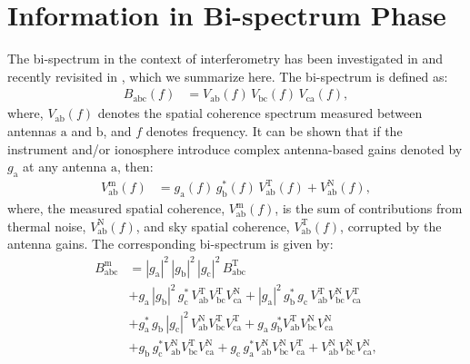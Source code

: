 \documentclass[
reprint,
superscriptaddress,
amsmath,
amssymb,
aps,
]{revtex4-1}
\begin{document}
\section{Information in Bi-spectrum Phase}\label{sec:CPinfo}

The bi-spectrum in the context of interferometry has been investigated in \cite{jen58,kul89,tay99,tho01} and recently revisited in \cite{car18}, which we summarize here. The bi-spectrum is defined as:
\begin{align}
  B_\textrm{abc}(f) &= V_\textrm{ab}(f)\,V_\textrm{bc}(f)\,V_\textrm{ca}(f),
\end{align}
where, $V_\textrm{ab}(f)$ denotes the spatial coherence spectrum measured between antennas $\textrm{a}$ and $\textrm{b}$, and $f$ denotes frequency. It can be shown that if the instrument and/or ionosphere introduce complex antenna-based gains denoted by $g_\textrm{a}$ at any antenna $\textrm{a}$, then: 
\begin{align}
  V_\textrm{ab}^\textrm{m}(f) &= g_\textrm{a}(f)\, g_\textrm{b}^*(f)\, V_\textrm{ab}^\textrm{T}(f) + V_\textrm{ab}^\textrm{N}(f),
\end{align}
where, the measured spatial coherence, $V_\textrm{ab}^\textrm{m}(f)$, is the sum of contributions from thermal noise, $V_\textrm{ab}^\textrm{N}(f)$, and sky spatial coherence, $V_\textrm{ab}^\textrm{T}(f)$, corrupted by the antenna gains. The corresponding bi-spectrum is given by:
\begin{align}\label{eqn:bispectrum-terms}
  B_\textrm{abc}^\textrm{m} &= |g_\textrm{a}|^2\, |g_\textrm{b}|^2\, |g_\textrm{c}|^2\, B_\textrm{abc}^\textrm{T} \\
  &+ g_\textrm{a}\,|g_\textrm{b}|^2\,g_\textrm{c}^*\,V_\textrm{ab}^\textrm{T}V_\textrm{bc}^\textrm{T}V_\textrm{ca}^\textrm{N} + |g_\textrm{a}|^2\,g_\textrm{b}^*\,g_\textrm{c}\,V_\textrm{ab}^\textrm{T}V_\textrm{bc}^\textrm{N}V_\textrm{ca}^\textrm{T} \nonumber \\
  &+ g_\textrm{a}^*\,g_\textrm{b}\,|g_\textrm{c}|^2\,V_\textrm{ab}^\textrm{N}V_\textrm{bc}^\textrm{T}V_\textrm{ca}^\textrm{T} + g_\textrm{a}\,g_\textrm{b}^*V_\textrm{ab}^\textrm{T}V_\textrm{bc}^\textrm{N}V_\textrm{ca}^\textrm{N} \nonumber \\
  &+ g_\textrm{b}\,g_\textrm{c}^*V_\textrm{ab}^\textrm{N}V_\textrm{bc}^\textrm{T}V_\textrm{ca}^\textrm{N} + g_\textrm{c}\,g_\textrm{a}^*V_\textrm{ab}^\textrm{N}V_\textrm{bc}^\textrm{N}V_\textrm{ca}^\textrm{T} + V_\textrm{ab}^\textrm{N}V_\textrm{bc}^\textrm{N}V_\textrm{ca}^\textrm{N}, \nonumber 
\end{align}
\end{document}
